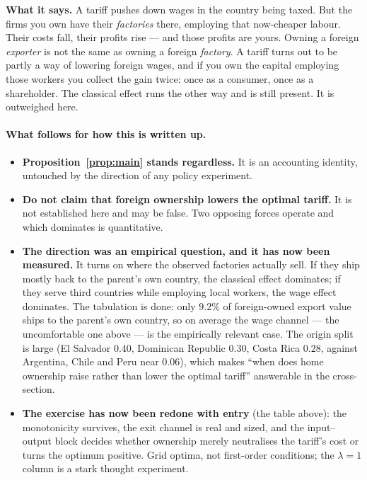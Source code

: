 \documentclass[11pt]{article}
\newcommand{\says}[1]{\smallskip\noindent\textbf{What it says.} #1\smallskip}
\theoremstyle{plain}
\theoremstyle{remark}
\theoremstyle{definition}
\begin{document}
\says{A tariff pushes down wages in the country being taxed. But the firms you own have
their \emph{factories} there, employing that now-cheaper labour. Their costs fall,
their profits rise --- and those profits are yours. Owning a foreign \emph{exporter} is
not the same as owning a foreign \emph{factory}. A tariff turns out to be partly a way
of lowering foreign wages, and if you own the capital employing those workers you
collect the gain twice: once as a consumer, once as a shareholder. The classical effect
runs the other way and is still present. It is outweighed here.}

\paragraph{What follows for how this is written up.}
\begin{itemize}
\item \textbf{Proposition~\ref{prop:main} stands regardless.} It is an accounting
identity, untouched by the direction of any policy experiment.
\item \textbf{Do not claim that foreign ownership lowers the optimal tariff.} It is not
established here and may be false. Two opposing forces operate and which dominates is
quantitative.
\item \textbf{The direction was an empirical question, and it has now been measured.}
It turns on where the observed factories actually sell. If they ship mostly back to the
parent's own country, the classical effect dominates; if they serve third countries
while employing local workers, the wage effect dominates. The tabulation is done: only
$9.2\%$ of foreign-owned export value ships to the parent's own country, so on average
the wage channel --- the uncomfortable one above --- is the empirically relevant case.
The origin split is large (El Salvador $0.40$, Dominican Republic $0.30$, Costa Rica
$0.28$, against Argentina, Chile and Peru near $0.06$), which makes ``when does home
ownership raise rather than lower the optimal tariff'' answerable in the cross-section.
\item \textbf{The exercise has now been redone with entry} (the table above): the
monotonicity survives, the exit channel is real and sized, and the input--output block
decides whether ownership merely neutralises the tariff's cost or turns the optimum
positive. Grid optima, not first-order conditions; the $\lambda=1$ column is a stark
thought experiment.
\end{itemize}
\end{document}
